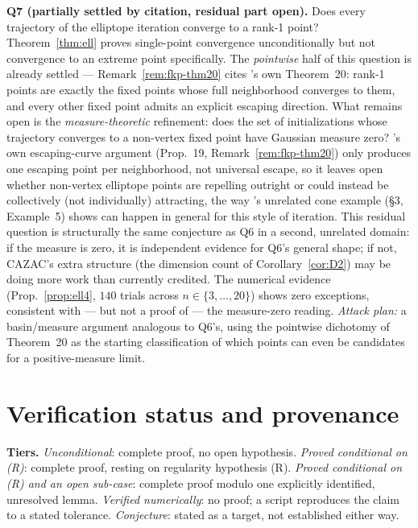 \documentclass[11pt]{article}
\theoremstyle{plain}
\theoremstyle{definition}
\theoremstyle{remark}
\begin{document}
\noindent\textbf{Q7 (partially settled by citation, residual part open).}
Does every trajectory of the elliptope iteration converge to a rank-1
point? Theorem~\ref{thm:ell} proves single-point convergence
unconditionally but not convergence to an extreme point specifically.
The \emph{pointwise} half of this question is already settled ---
Remark~\ref{rem:fkp-thm20} cites \cite{FKP21}'s own Theorem~20: rank-1
points are exactly the fixed points whose full neighborhood converges to
them, and every other fixed point admits an explicit escaping direction.
What remains open is the \emph{measure-theoretic} refinement: does the
set of initializations whose trajectory converges to a non-vertex fixed
point have Gaussian measure zero? \cite{FKP21}'s own escaping-curve
argument (Prop.~19, Remark~\ref{rem:fkp-thm20}) only produces one
escaping point per neighborhood, not universal escape, so it leaves open
whether non-vertex elliptope points are repelling outright or could
instead be collectively (not individually) attracting, the way
\cite{FKP21}'s unrelated cone example (\S3, Example~5) shows can happen
in general for this style of iteration. This residual
question is structurally the same conjecture as Q6 in a second, unrelated
domain: if the measure is zero, it is independent evidence for Q6's
general shape; if not, CAZAC's extra structure (the dimension count of
Corollary~\ref{cor:D2}) may be doing more work than currently credited.
The numerical evidence (Prop.~\ref{prop:ell4}, $140$ trials across
$n\in\{3,\dots,20\}$) shows zero exceptions, consistent with --- but
not a proof of --- the measure-zero reading. \emph{Attack plan:} a
basin/measure argument analogous to Q6's, using the pointwise dichotomy
of Theorem~20 as the starting classification of which points can even be
candidates for a positive-measure limit.

\section{Verification status and provenance}

\textbf{Tiers.} \emph{Unconditional}: complete proof, no open hypothesis.
\emph{Proved conditional on (R)}: complete proof, resting on regularity
hypothesis (R). \emph{Proved conditional on (R) and an open sub-case}:
complete proof modulo one explicitly identified, unresolved lemma.
\emph{Verified numerically}: no proof; a script reproduces the claim to a
stated tolerance. \emph{Conjecture}: stated as a target, not established
either way.
\end{document}
